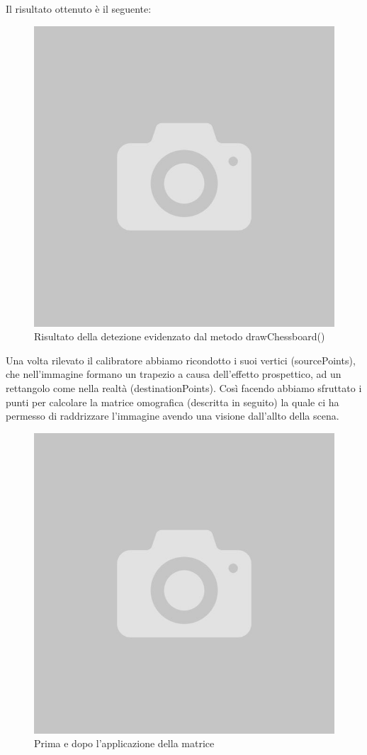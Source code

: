\documentclass[twoside]{supsistudent}
\begin{document}
Il risultato ottenuto è il seguente:
\begin{figure}[H]
  \center
  \includegraphics[scale=0.5]{images/empty.jpg}
  \caption{Risultato della detezione evidenzato dal metodo drawChessboard()}
\end{figure}
Una volta rilevato il calibratore abbiamo ricondotto i suoi vertici (sourcePoints), che nell'immagine formano un trapezio a causa dell'effetto prospettico, ad un rettangolo come nella realtà (destinationPoints). 
Così facendo abbiamo sfruttato i punti per calcolare la matrice omografica (descritta in seguito) la quale ci ha permesso di raddrizzare l'immagine 
avendo una visione dall'allto della scena. 
\begin{figure}[H]
  \center
  \includegraphics[scale=0.5]{images/empty.jpg}
  \caption{Prima e dopo l'applicazione della matrice}
\end{figure}
\end{document}
